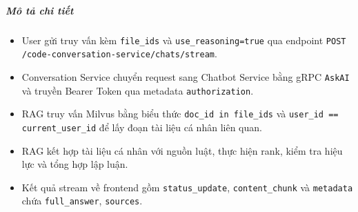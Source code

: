 \subparagraph{Mô tả chi tiết}
\begin{itemize}
\item User gửi truy vấn kèm \texttt{file\_ids} và \texttt{use\_reasoning=true} qua endpoint \texttt{POST /code-conversation-service/chats/stream}.
\item Conversation Service chuyển request sang Chatbot Service bằng gRPC \texttt{AskAI} và truyền Bearer Token qua metadata \texttt{authorization}.
\item RAG truy vấn Milvus bằng biểu thức \texttt{doc\_id in file\_ids} và \texttt{user\_id == current\_user\_id} để lấy đoạn tài liệu cá nhân liên quan.
\item RAG kết hợp tài liệu cá nhân với nguồn luật, thực hiện rank, kiểm tra hiệu lực và tổng hợp lập luận.
\item Kết quả stream về frontend gồm \texttt{status\_update}, \texttt{content\_chunk} và \texttt{metadata} chứa \texttt{full\_answer}, \texttt{sources}.
\end{itemize}
